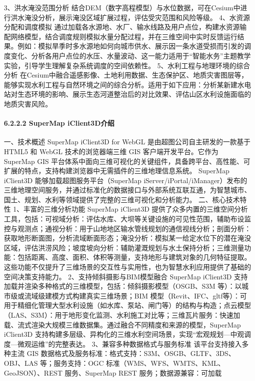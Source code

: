 {3、洪水淹没范围分析 结合DEM（数字高程模型）与水位数据，可在Cesium中进行洪水淹没分析，展示淹没区域扩展过程，评估受灾范围和风险等级。 4、水资源分配和调度模拟
通过加载各水源地、水厂、输水线路及用户点位，构建水资源输配网络模型，结合调度规则模拟水量分配过程，并在三维空间中实时反馈运行结果。例如：模拟旱季时多水源地如何向城市供水、展示因一条水道受损而引发的调度变化、分析各用户点位的水压、水量波动、这一能力适用于``智能水务''主题教学实验，引导学生理解复杂系统调度的空间依赖性。
5、水利工程与地理环境的综合分析
在Cesium中融合遥感影像、土地利用数据、生态保护区、地质灾害图层等，能够实现水利工程与自然环境之间的综合分析。适用于如下应用：分析某新建水电站对生态环境的影响、展示生态河道整治后的对比效果、评估山区水利设施面临的地质灾害风险。
\paragraph{6.2.2.2 SuperMap iClient3D介绍}\label{supermap-iclient3dux4ecbux7ecd} 一、技术概述 SuperMap iClient3D for WebGL
是由超图公司自主研发的一款基于 HTML5 和 WebGL 技术的浏览器端三维 GIS 客户端开发平台。它作为 SuperMap GIS
平台体系中面向三维可视化的关键组件，具备跨平台、高性能、可扩展的特点，支持构建浏览器中无需插件的三维地理信息系统。 SuperMap iClient3D 能够加载超图服务平台（SuperMap
iServer/iPortal/iManager）发布的三维地理空间服务，并通过标准化的数据接口与外部系统互联互通，为智慧城市、国土、规划、水利等领域提供了完整的三维可视化和分析能力。 二、核心技术特性 1、丰富的三维分析功能
SuperMap iClient3D
提供了众多内置的三维空间分析工具，包括：可视域分析：评估水库、大坝等关键设施的可见性范围，辅助布设监控与观测点；通视分析：用于山地地区输水管线规划的通信视线分析；剖面分析：获取地形断面图，分析流域断面形态；淹没分析：模拟某一给定水位下的潜在淹没区域，评估洪涝风险；坡度坡向分析：辅助灌溉规划与水土保持分析；三维测量功能：包括距离、高度、面积、体积等测量，支持地形与建筑对象的几何特征提取。
这些功能不仅提升了三维场景的交互性与实用性，也为智慧水利应用提供了基础的空间决策支持能力。 2、支持倾斜摄影与BIM模型融合 SuperMap iClient3D 支持加载并渲染多种格式的三维模型，包括：倾斜摄影模型（OSGB、S3M
等）：以城市级或流域级建模方式构建真实三维场景；BIM
模型（Revit、IFC、gltf等）：可用于精细化管理大型水利设施（如水库、泵站、闸门等）的结构与构造；点云模型（LAS、S3M）：用于地形变化监测、水利施工对比等；三维瓦片服务：快速加载、流式渲染大规模三维数据集。通过融合不同精度和来源的模型，SuperMap
iClient3D 支持构建多层级、异构化的三维水利空间场景，实现``宏观规划---中观调度---微观运维''的完整表达。 3、兼容多种数据格式与服务标准 该平台支持接入多种主流 GIS
数据格式及服务标准：格式支持：S3M、OSGB、GLTF、3DS、OBJ、LAS 等；服务支持：OGC 标准（WMS、WFS、WMTS、KML、GeoJSON）、REST 服务、SuperMap REST 服务；数据源兼容：可加载
}
